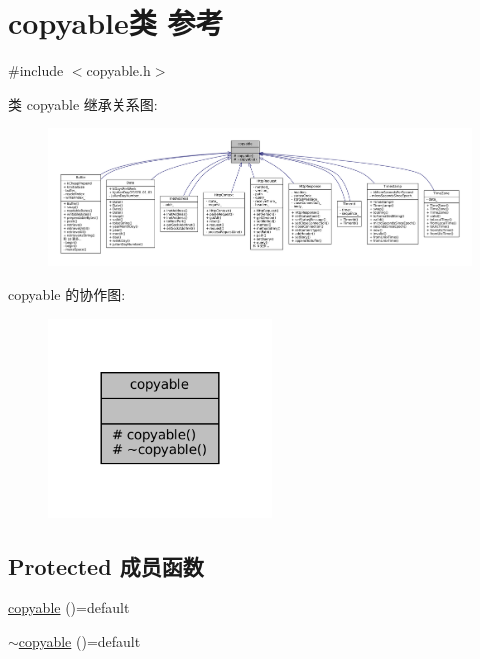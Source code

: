 \hypertarget{classmuduo_1_1copyable}{}\section{copyable类 参考}
\label{classmuduo_1_1copyable}


{\ttfamily \#include $<$copyable.\+h$>$}



类 copyable 继承关系图\+:
\nopagebreak
\begin{figure}[H]
\begin{center}
\leavevmode
\includegraphics[width=350pt]{classmuduo_1_1copyable__inherit__graph}
\end{center}
\end{figure}


copyable 的协作图\+:
\nopagebreak
\begin{figure}[H]
\begin{center}
\leavevmode
\includegraphics[width=168pt]{classmuduo_1_1copyable__coll__graph}
\end{center}
\end{figure}
\subsection*{Protected 成员函数}
\begin{DoxyCompactItemize}
\item 
\hyperlink{classmuduo_1_1copyable_ac8579356ab6a1c47424c42769858aaee}{copyable} ()=default
\item 
\hyperlink{classmuduo_1_1copyable_a9b4f930d069a7d0cd78c4f6c19c94727}{$\sim$copyable} ()=default
\end{DoxyCompactItemize}


